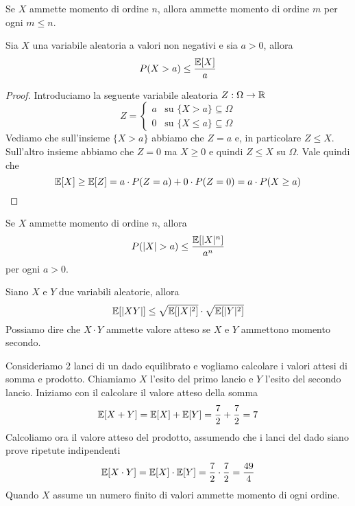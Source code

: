 \begin{proposition}
	Se $X$ ammette momento di ordine $n$, allora ammette momento di ordine $m$ per ogni $m \leq n$.
\end{proposition}

\begin{proposition}
	Sia $X$ una variabile aleatoria a valori non negativi e sia $a>0$, allora
	\[ P(X > a) \leq \frac{\mathbb{E}[X]}{a} \]
	\begin{proof}
		Introduciamo la seguente variabile aleatoria $Z : \Omega \to \mathbb{R}$
		\[
			Z = \begin{cases}
				a & \text{su } \{ X > a \} \subseteq \Omega    \\
				0 & \text{su } \{ X \leq a \} \subseteq \Omega
			\end{cases}
		\]
		Vediamo che sull'insieme $\{ X > a \}$ abbiamo che $Z = a$ e, in particolare $Z \leq X$.
		Sull'altro insieme abbiamo che $Z = 0$ ma $X \geq 0$ e quindi $Z \leq X$ su $\Omega$.
		Vale quindi che
		\[ \mathbb{E}[X] \geq \mathbb{E}[Z] = a \cdot P(Z = a) + 0 \cdot P(Z = 0) = a \cdot P(X \geq a) \]
	\end{proof}
\end{proposition}

\begin{corollary}
	Se $X$ ammette momento di ordine $n$, allora
	\[ P(|X| > a) \leq \frac{\mathbb{E}[|X|^n]}{a^n} \]
	per ogni $a > 0$.
\end{corollary}

\begin{proposition}
	Siano $X$ e $Y$ due variabili aleatorie, allora
	\[ \mathbb{E}[|XY|] \leq \sqrt{\mathbb{E}[|X|^2]} \cdot \sqrt{\mathbb{E}[|Y|^2]} \]
	Possiamo dire che $X \cdot Y$ ammette valore atteso se $X$ e $Y$ ammettono momento secondo.
\end{proposition}

\begin{example}
	Consideriamo 2 lanci di un dado equilibrato e vogliamo calcolare i valori attesi di somma e
	prodotto. Chiamiamo $X$ l'esito del primo lancio e $Y$ l'esito del secondo lancio. Iniziamo
	con il calcolare il valore atteso della somma
	\[ \mathbb{E}[X + Y] = \mathbb{E}[X] + \mathbb{E}[Y] = \frac{7}{2} + \frac{7}{2} = 7 \]
	Calcoliamo ora il valore atteso del prodotto, assumendo che i lanci del dado siano prove
	ripetute indipendenti
	\[ \mathbb{E}[X \cdot Y] = \mathbb{E}[X] \cdot \mathbb{E}[Y] = \frac{7}{2} \cdot \frac{7}{2} = \frac{49}{4} \]
	Quando $X$ assume un numero finito di valori ammette momento di ogni ordine.
\end{example}

